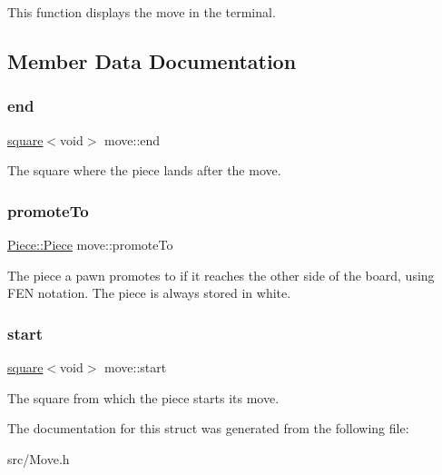 This function displays the move in the terminal. 

\subsection{Member Data Documentation}
\mbox{\label{structmove_a205ae16ec975ed71eb4233bb38d21a75}} 
\subsubsection{\texorpdfstring{end}{end}}
{\footnotesize\ttfamily \hyperlink{structsquare}{square}$<$void$>$ move\+::end}

The square where the piece lands after the move. \mbox{\label{structmove_a87fc4fc521c961cce03613dcb6cd0c6b}} 
\subsubsection{\texorpdfstring{promote\+To}{promoteTo}}
{\footnotesize\ttfamily \hyperlink{namespacePiece_a588233307aa6bdb32c1d62c9f20895cc}{Piece\+::\+Piece} move\+::promote\+To}

The piece a pawn promotes to if it reaches the other side of the board, using F\+EN notation. The piece is always stored in white. \mbox{\label{structmove_a3f8a82f7c7bc55f55874026ac254cd85}} 
\subsubsection{\texorpdfstring{start}{start}}
{\footnotesize\ttfamily \hyperlink{structsquare}{square}$<$void$>$ move\+::start}

The square from which the piece starts its move. 

The documentation for this struct was generated from the following file\+:\begin{DoxyCompactItemize}
\item 
src/Move.\+h\end{DoxyCompactItemize}
